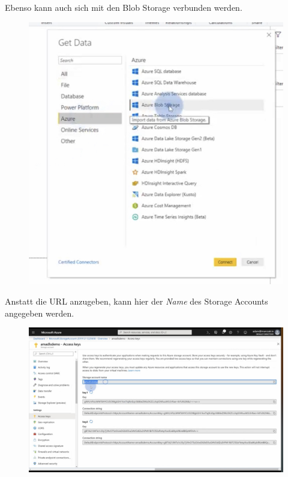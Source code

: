 Ebenso kann auch sich mit den Blob Storage verbunden werden.

\begin{figure}[H]
	\centering
	\includegraphics[scale = 0.2]{attachment/chapter_2/Scc129}
\end{figure}

Anstatt die URL anzugeben, kann hier der \textit{Name} des Storage Accounts angegeben werden.

\begin{figure}[H]
	\centering
	\includegraphics[scale = 0.2]{attachment/chapter_2/Scc130}
\end{figure}

